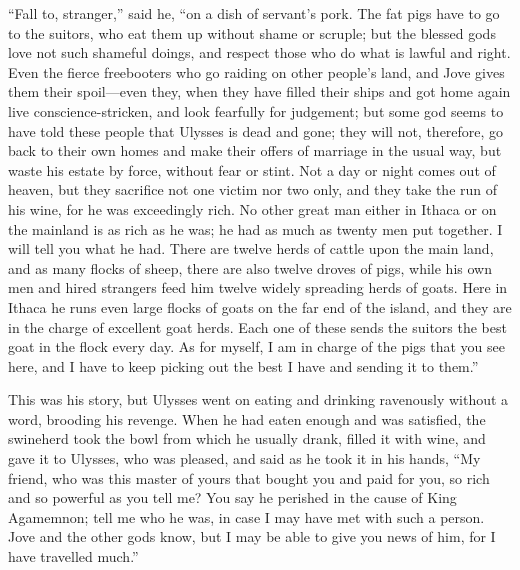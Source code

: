 “Fall to, stranger,” said he, “on a dish of servant’s pork. The fat pigs have
to go to the suitors, who eat them up without shame or scruple; but the blessed
gods love not such shameful doings, and respect those who do what is lawful and
right. Even the fierce freebooters who go raiding on other people’s land, and
Jove gives them their spoil—even they, when they have filled their ships and
got home again live conscience-stricken, and look fearfully for judgement; but
some god seems to have told these people that Ulysses is dead and gone; they
will not, therefore, go back to their own homes and make their offers of
marriage in the usual way, but waste his estate by force, without fear or
stint. Not a day or night comes out of heaven, but they sacrifice not one
victim nor two only, and they take the run of his wine, for he was exceedingly
rich. No other great man either in Ithaca or on the mainland is as rich as he
was; he had as much as twenty men put together. I will tell you what he had.
There are twelve herds of cattle upon the main land, and as many flocks of
sheep, there are also twelve droves of pigs, while his own men and hired
strangers feed him twelve widely spreading herds of goats. Here in Ithaca he
runs even large flocks of goats on the far end of the island, and they are in
the charge of excellent goat herds. Each one of these sends the suitors the
best goat in the flock every day. As for myself, I am in charge of the pigs
that you see here, and I have to keep picking out the best I have and sending
it to them.”

This was his story, but Ulysses went on eating and drinking ravenously without
a word, brooding his revenge. When he had eaten enough and was satisfied, the
swineherd took the bowl from which he usually drank, filled it with wine, and
gave it to Ulysses, who was pleased, and said as he took it in his hands, “My
friend, who was this master of yours that bought you and paid for you, so rich
and so powerful as you tell me? You say he perished in the cause of King
Agamemnon; tell me who he was, in case I may have met with such a person. Jove
and the other gods know, but I may be able to give you news of him, for I have
travelled much.”

